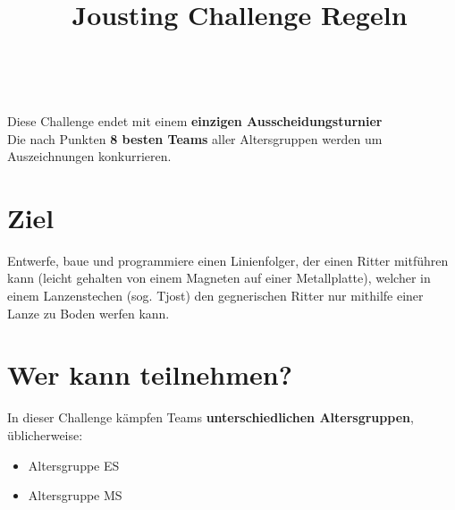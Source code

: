 \documentclass[a4paper,12pt]{article}
\begin{document}


\title{\tagYear\ Jousting Challenge Regeln}

\makeatletter
\let\inserttitle\@title
\makeatother
\begin{center}
	\rrgerLogo
	\huge                      %
	\bfseries                   %
	\\
	\inserttitle
\end{center}

\begin{center}
Diese Challenge endet mit einem \textbf{einzigen Ausscheidungsturnier}
\\
Die nach Punkten \textbf{8 besten Teams} aller Altersgruppen werden um
Auszeichnungen konkurrieren.
\end{center}
\section{Ziel}
Entwerfe, baue und programmiere einen Linienfolger, der einen Ritter mitführen
kann (leicht gehalten von einem Magneten auf einer Metallplatte), welcher in
einem Lanzenstechen (sog. Tjost) den gegnerischen Ritter nur mithilfe einer
Lanze zu Boden werfen kann.
\section{Wer kann teilnehmen?}
In dieser Challenge kämpfen Teams \textbf{unterschiedlichen Altersgruppen},
üblicherweise:
\begin{itemize}
	\item Altersgruppe ES
	\item Altersgruppe MS
\end{itemize}
\end{document}
